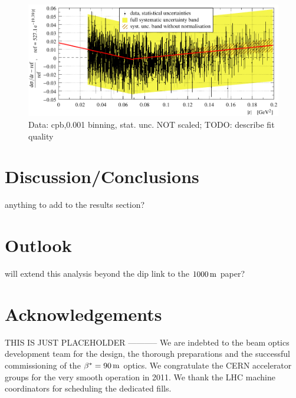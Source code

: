 \documentclass[TOTEM]{cern/cernphprep}
\def\un#1{\,{\rm #1}}
\def\acknowledgments{\section*{Acknowledgements}}
\def\hang{\hangindent=\parindent}
\def\>{\par\vskip\itskip\parindent\itindent\indent\hang\llap{\hbox to3mm{$\bullet$\hss}}}
\def\>E{\par\vskip\itskip\parindent\itindent\indent\hang\llap{\hbox to3mm{\hss}}}
\def\>>{\par\vskip\iitskip\parindent\iitindent\indent\hang\llap{\hbox to\iitindent{\hss--\ }}}
\begin{document}
\begin{figure}
\begin{center}
\includegraphics[width=18cm]{fig/t_dist_rel_with_split_fit.pdf}
\caption{Data: cpb,0.001 binning, stat. unc. NOT scaled; TODO: describe fit quality}
\label{fig:data rel cpb0.001}
\end{center}
\end{figure}


\section{Discussion/Conclusions}

\> anything to add to the results section?

\section{Outlook}

\> will extend this analysis beyond the dip
\> link to the $1000\un{m}$ paper?


\acknowledgments

THIS IS JUST PLACEHOLDER -----------
We are indebted to the beam optics development team
for the design, the thorough preparations and the successful commissioning of the $\beta^* = 90\un{m}$ optics. We congratulate the CERN accelerator groups for the very smooth operation in 2011. We thank
the LHC machine coordinators for scheduling the dedicated fills.
\end{document}
